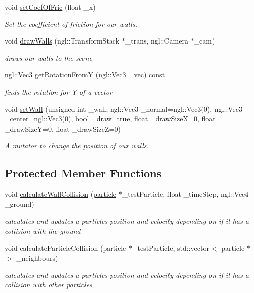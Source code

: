 \begin{DoxyCompactItemize}
void \hyperlink{classcollision_a2e8c12193fc78bc8895b741f34a2f8c8}{set\-Coef\-Of\-Fric} (float \-\_\-x)
\begin{DoxyCompactList}\small\item\em Set the coefficient of friction for our walls. \end{DoxyCompactList}\item 
void \hyperlink{classcollision_a8abe6aa1ad18a45acd1144752222b014}{draw\-Walls} (ngl\-::\-Transform\-Stack $\ast$\-\_\-trans, ngl\-::\-Camera $\ast$\-\_\-cam)
\begin{DoxyCompactList}\small\item\em draws our walls to the scene \end{DoxyCompactList}\item 
ngl\-::\-Vec3 \hyperlink{classcollision_a91504adc5badb96d7ba53e8be7923728}{get\-Rotation\-From\-Y} (ngl\-::\-Vec3 \-\_\-vec) const 
\begin{DoxyCompactList}\small\item\em finds the rotation for Y of a vector \end{DoxyCompactList}\item 
void \hyperlink{classcollision_afbd4c4d461710c9734b77d431f126de3}{set\-Wall} (unsigned int \-\_\-wall, ngl\-::\-Vec3 \-\_\-normal=ngl\-::\-Vec3(0), ngl\-::\-Vec3 \-\_\-center=ngl\-::\-Vec3(0), bool \-\_\-draw=true, float \-\_\-draw\-Size\-X=0, float \-\_\-draw\-Size\-Y=0, float \-\_\-draw\-Size\-Z=0)
\begin{DoxyCompactList}\small\item\em A mutator to change the position of our walls. \end{DoxyCompactList}\end{DoxyCompactItemize}
\subsection*{Protected Member Functions}
\begin{DoxyCompactItemize}
\item 
void \hyperlink{classcollision_aa1636f1eea3912906a36831c9b43f462}{calculate\-Wall\-Collision} (\hyperlink{classparticle}{particle} $\ast$\-\_\-test\-Particle, float \-\_\-time\-Step, ngl\-::\-Vec4 \-\_\-ground)
\begin{DoxyCompactList}\small\item\em calculates and updates a particles position and velocity depending on if it has a collision with the ground \end{DoxyCompactList}\item 
void \hyperlink{classcollision_aa7862d6a6f35f02c4a1f4c564e942fcc}{calculate\-Particle\-Collision} (\hyperlink{classparticle}{particle} $\ast$\-\_\-test\-Particle, std\-::vector$<$ \hyperlink{classparticle}{particle} $\ast$ $>$ \-\_\-neighbours)
\begin{DoxyCompactList}\small\item\em calculates and updates a particles position and velocity depending on if it has a collision with other particles \end{DoxyCompactList}\end{DoxyCompactItemize}


